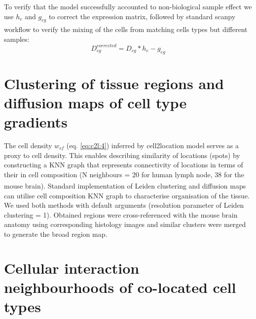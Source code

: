 \documentclass[11pt,a4paper]{article}
\begin{document}
\begin{enumerate}
    To verify that the model successfully accounted to non-biological sample effect we use $h_e$ and $g_{eg}$ to correct the expression matrix, followed by standard scanpy workflow \textsuperscript{\cite{wolf_scanpy_2018}} to verify the mixing of the cells from matching cells types but different samples:
    \begin{equation} \label{eq:c2l_ref_prog:3}
    D^{corrected}_{cg} = D_{cg} * {h_e} - g_{eg}
    \end{equation}

\end{enumerate}

\section{Clustering of tissue regions and diffusion maps of cell type gradients} \label{auto_clustering}

The cell density $w_{sf}$ (eq. \ref{eq:c2l:4}) inferred by cell2location model serves as a proxy to cell density. This enables describing similarity of locations (spots) by constructing a KNN graph that represents connectivity of locations in terms of their in cell composition (N neighbours = 20 for human lymph node, 38 for the mouse brain). Standard implementation of Leiden clustering and diffusion maps \textsuperscript{\cite{wolf_scanpy_2018}} can utilise cell composition KNN graph to characterise organisation of the tissue. We used both methods with default arguments (resolution parameter of Leiden clustering = 1). Obtained regions were cross-referenced with the mouse brain anatomy using corresponding histology images and similar clusters were merged to generate the broad region map.

\section{Cellular interaction neighbourhoods of co-located cell types} \label{cell_neighbourhoods}
\end{document}
